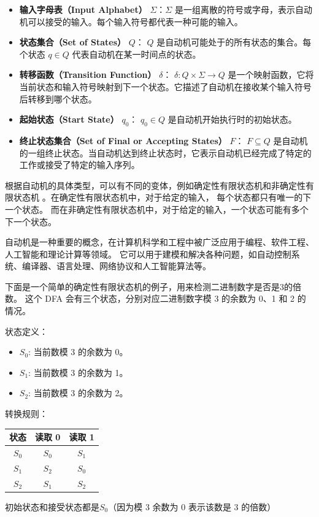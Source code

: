 \begin{itemize}
    \item \textbf{输入字母表（Input Alphabet）} \( \Sigma \)：\(\Sigma\) 是一组离散的符号或字母，表示自动机可以接受的输入。每个输入符号都代表一种可能的输入。
    
    \item \textbf{状态集合（Set of States）} \( Q \)： \( Q \) 是自动机可能处于的所有状态的集合。每个状态 \( q \in Q \) 代表自动机在某一时间点的状态。
    
    \item \textbf{转移函数（Transition Function）} \( \delta \)： \(\delta: Q \times \Sigma \rightarrow Q\) 是一个映射函数，它将当前状态和输入符号映射到下一个状态。它描述了自动机在接收某个输入符号后转移到哪个状态。
    
    \item \textbf{起始状态（Start State）} \( q_0 \)： \( q_0 \in Q \) 是自动机开始执行时的初始状态。
    
    \item \textbf{终止状态集合（Set of Final or Accepting States）} \( F \)： \( F \subseteq Q \) 是自动机的一组终止状态。当自动机达到终止状态时，它表示自动机已经完成了特定的工作或接受了特定的输入序列。
\end{itemize}

根据自动机的具体类型，可以有不同的变体，例如确定性有限状态机和非确定性有限状态机
。在确定性有限状态机中，对于给定的输入，
每个状态都只有唯一的下一个状态。
而在非确定性有限状态机中，对于给定的输入，一个状态可能有多个下一个状态。

自动机是一种重要的概念，在计算机科学和工程中被广泛应用于编程、软件工程、人工智能和理论计算等领域。
它可以用于建模和解决各种问题，如自动控制系统、编译器、语言处理、网络协议和人工智能算法等。

下面是一个简单的确定性有限状态机的例子，用来检测二进制数字是否是3的倍数。
这个 DFA 会有三个状态，分别对应二进制数字模 3 的余数为 0、1 和 2 的情况。

状态定义：
\begin{itemize}
    \item $S_0$: 当前数模 3 的余数为 0。
    \item $S_1$: 当前数模 3 的余数为 1。
    \item $S_2$: 当前数模 3 的余数为 2。
\end{itemize}
转换规则：
\begin{center}
    \begin{tabular}{c|c|c}
        状态 & 读取 0 & 读取 1 \\
        \hline
        $S_0$ & $S_0$ & $S_1$ \\
        $S_1$ & $S_2$ & $S_0$ \\
        $S_2$ & $S_1$ & $S_2$ \\
    \end{tabular}
\end{center}
初始状态和接受状态都是$S_0$（因为模 3 余数为 0 表示该数是 3 的倍数）

